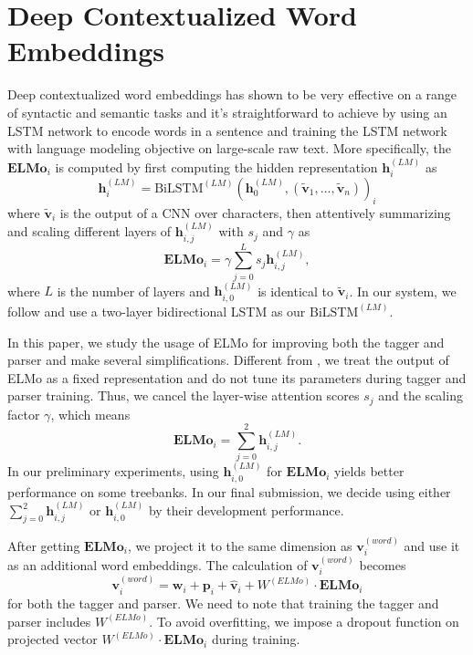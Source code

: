 \documentclass[11pt,a4paper]{article}
\begin{document}
\section{Deep Contextualized Word Embeddings}\label{sec:elmo}

Deep contextualized word embeddings \citep[ELMo]{N18-1202}
has shown to
be very effective on a range of syntactic and semantic tasks
and it's straightforward to achieve by
using an LSTM network to encode words in a sentence
and training the LSTM network with language modeling objective
on large-scale raw text.
More specifically, the $\mathbf{ELMo}_i$ is computed
by first computing the hidden representation $\mathbf{h}_i^{(LM)}$ as
\[
\mathbf{h}_i^{(LM)} =  \text{BiLSTM}^{(LM)}(\mathbf{h}_0^{(LM)}, (\mathbf{\tilde{v}}_1, ..., \mathbf{\tilde{v}}_n))_i
\]
where $\mathbf{\tilde{v}}_i$ is the output of a CNN over characters,
then attentively summarizing and scaling different layers of  $\mathbf{h}_{i, j}^{(LM)}$
with $s_j$ and $\gamma$
as
\[
\mathbf{ELMo}_i = \gamma \sum_{j=0}^L s_j \mathbf{h}_{i, j}^{(LM)},
\]
where $L$ is the number of layers and $\mathbf{h}_{i, 0}^{(LM)}$ is identical to $\mathbf{\tilde{v}}_i$.
In our system, we follow \citet{N18-1202} and use a two-layer bidirectional LSTM as our $\text{BiLSTM}^{(LM)}$.

In this paper, we study the usage of ELMo for improving both
the tagger and parser and make several simplifications.
Different from \citet{N18-1202}, we treat the output of ELMo as a fixed representation
and do not tune its parameters during tagger and parser training.
Thus, we cancel the layer-wise attention scores $s_j$ and the scaling factor $\gamma$, 
which means
\[
\mathbf{ELMo}_i = \sum_{j=0}^{2} \mathbf{h}_{i, j}^{(LM)}.
\]
In our preliminary experiments, using $ \mathbf{h}_{i, 0}^{(LM)}$ for $\mathbf{ELMo}_i$
yields better performance on some treebanks.
In our final submission, we decide using either $\sum_{j=0}^{2} \mathbf{h}_{i, j}^{(LM)}$
or $ \mathbf{h}_{i, 0}^{(LM)}$ by their development performance.

After getting $\mathbf{ELMo}_i$, we project it
to the same dimension as $\mathbf{v}_i^{(word)}$ and
use it as an additional word embeddings.
The calculation of $\mathbf{v}_i^{(word)}$ becomes
\[
\mathbf{v}_i^{(word)} = \mathbf{w}_i + \mathbf{p}_i + \mathbf{\hat{v}}_i + W^{(ELMo)} \cdot \mathbf{ELMo}_i
\]
for both the tagger and parser.
We need to note that training the tagger and parser includes $W^{(ELMo)}$.
To avoid overfitting, we impose a dropout function on projected vector
$W^{(ELMo)} \cdot \mathbf{ELMo}_i$
during training.
\end{document}
